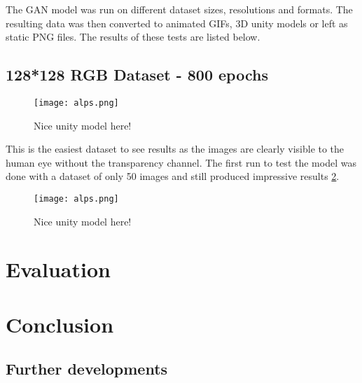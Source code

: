\documentclass[a4paper]{report}
\begin{document}
The GAN model was run on different dataset sizes, resolutions and formats. The resulting data was then converted to animated GIFs, 3D unity models or left as static PNG files. The results of these tests are listed below.

\subsection{128*128 RGB Dataset - 800 epochs}
\begin{figure}[H]
    \centering
        \texttt{[image: alps.png]}
        \caption{Nice unity model here!}
        \label{fig:ToDo}
\end{figure}
This is the easiest dataset to see results as the images are clearly visible to the human eye without the transparency channel. The first run to test the model was done with a dataset of only 50 images and still produced impressive results \ref{fig:ToDo}.
\begin{figure}[H]
    \centering
        \texttt{[image: alps.png]}
        \caption{Nice unity model here!}
        \label{fig:ToDo}
\end{figure}

\section{Evaluation}
\section{Conclusion}
\subsection{Further developments}
\end{document}

